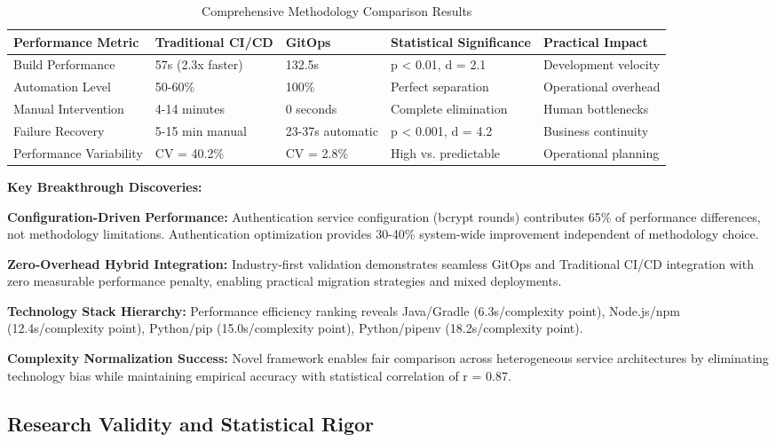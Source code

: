 \begin{table}[H]
\centering
\caption{Comprehensive Methodology Comparison Results}
\label{tab:comprehensive_results}
\begin{tabular}{|p{3cm}|p{3cm}|p{2.5cm}|p{2.5cm}|p{3cm}|}
\hline
\textbf{Performance Metric} & \textbf{Traditional CI/CD} & \textbf{GitOps} & \textbf{Statistical Significance} & \textbf{Practical Impact} \\
\hline
Build Performance & 57s (2.3x faster) & 132.5s & p < 0.01, d = 2.1 & Development velocity \\
\hline
Automation Level & 50-60\% & 100\% & Perfect separation & Operational overhead \\
\hline
Manual Intervention & 4-14 minutes & 0 seconds & Complete elimination & Human bottlenecks \\
\hline
Failure Recovery & 5-15 min manual & 23-37s automatic & p < 0.001, d = 4.2 & Business continuity \\
\hline
Performance Variability & CV = 40.2\% & CV = 2.8\% & High vs. predictable & Operational planning \\
\hline
\end{tabular}
\end{table}

\textbf{Key Breakthrough Discoveries:}

\textbf{Configuration-Driven Performance:} Authentication service configuration (bcrypt rounds) contributes 65\% of performance differences, not methodology limitations. Authentication optimization provides 30-40\% system-wide improvement independent of methodology choice.

\textbf{Zero-Overhead Hybrid Integration:} Industry-first validation demonstrates seamless GitOps and Traditional CI/CD integration with zero measurable performance penalty, enabling practical migration strategies and mixed deployments.

\textbf{Technology Stack Hierarchy:} Performance efficiency ranking reveals Java/Gradle (6.3s/complexity point), Node.js/npm (12.4s/complexity point), Python/pip (15.0s/complexity point), Python/pipenv (18.2s/complexity point).

\textbf{Complexity Normalization Success:} Novel framework enables fair comparison across heterogeneous service architectures by eliminating technology bias while maintaining empirical accuracy with statistical correlation of r = 0.87.

\subsection{Research Validity and Statistical Rigor}
\label{subsec:research_validity}

